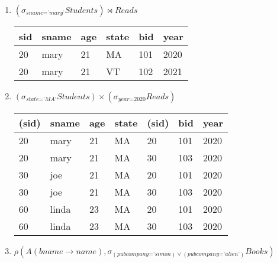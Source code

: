 \documentclass[letterpaper, 11pt]{article}
\begin{document}
\begin{enumerate}[label={\alph*}),leftmargin=*]
    \item $(\sigma_{\textit{sname='mary'}}\textit{Students}) \bowtie \textit{Reads}$
    \begin{table}[H]
        \centering
        \begin{tabular}{|l|l|l|l|l|l|}
            \hline
            \cellcolor[HTML]{b4c6e7} sid & \cellcolor[HTML]{b4c6e7} sname & \cellcolor[HTML]{b4c6e7} age & \cellcolor[HTML]{b4c6e7} state & \cellcolor[HTML]{b4c6e7} bid & \cellcolor[HTML]{b4c6e7} year \\
            \hline
            20 & mary & 21 & MA & 101 & 2020 \\
            \hline
            20 & mary & 21 & VT & 102 & 2021 \\
            \hline
        \end{tabular}
    \end{table}
    \item $(\sigma_{\textit{state='MA'}}\textit{Students}) \times (\sigma_{\textit{year=2020}}\textit{Reads})$
    \begin{table}[H]
        \centering
        \begin{tabular}{|l|l|l|l|l|l|l|}
        \hline
            \cellcolor[HTML]{b4c6e7} (sid) & \cellcolor[HTML]{b4c6e7} sname & \cellcolor[HTML]{b4c6e7} age & \cellcolor[HTML]{b4c6e7} state & \cellcolor[HTML]{b4c6e7} (sid) & \cellcolor[HTML]{b4c6e7} bid & \cellcolor[HTML]{b4c6e7} year \\
            \hline
            20 & mary & 21 & MA & 20 & 101 & 2020 \\
            \hline
            20 & mary & 21 & MA & 30 & 103 & 2020 \\
            \hline
            30 & joe & 21 & MA & 20 & 101 & 2020 \\
            \hline
            30 & joe & 21 & MA & 30 & 103 & 2020 \\
            \hline
            60 & linda & 23 & MA & 20 & 101 & 2020 \\
            \hline
            60 & linda & 23 & MA & 30 & 103 & 2020 \\
            \hline
        \end{tabular}
    \end{table}
    \item $\rho(A(\textit{bname} \to \textit{name}), \sigma_{(\textit{pubcompany='simon})\vee (\textit{pubcompany='alien'})} \textit{Books})$
    \begin{table}[H]
        \centering
        \begin{tabular}{|l|l|l|l|l|}

\end{tabular}
\end{table}
\end{enumerate}
\end{document}
